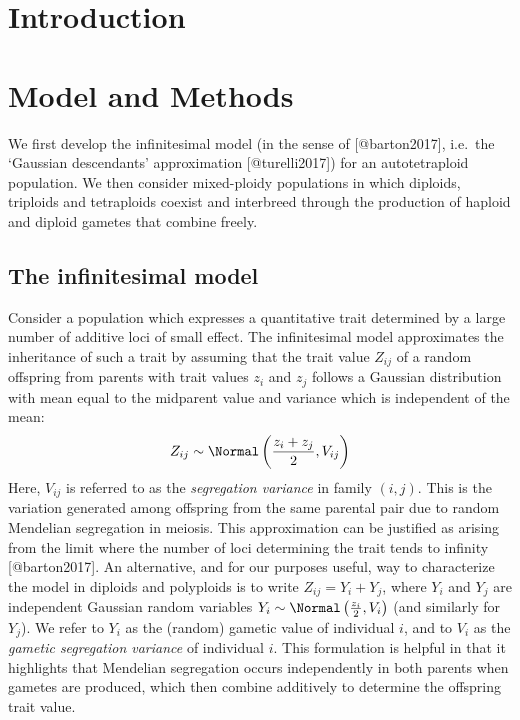 \hypertarget{introduction}{%
\section{Introduction}\label{introduction}}

\hypertarget{model-and-methods}{%
\section{Model and Methods}\label{model-and-methods}}

We first develop the infinitesimal model (in the sense of
{[}@barton2017{]}, i.e.~the `Gaussian descendants' approximation
{[}@turelli2017{]}) for an autotetraploid population. We then consider
mixed-ploidy populations in which diploids, triploids and tetraploids
coexist and interbreed through the production of haploid and diploid
gametes that combine freely.

\hypertarget{the-infinitesimal-model}{%
\subsection{The infinitesimal model}\label{the-infinitesimal-model}}

Consider a population which expresses a quantitative trait determined by
a large number of additive loci of small effect. The infinitesimal model
approximates the inheritance of such a trait by assuming that the trait
value \(Z_{ij}\) of a random offspring from parents with trait values
\(z_i\) and \(z_j\) follows a Gaussian distribution with mean equal to
the midparent value and variance which is independent of the mean:
\begin{align}
  Z_{ij} \sim \Normal\left(\frac{z_i + z_j}{2}, V_{ij}\right)
  \label{eq:inf}
  \end{align} Here, \(V_{ij}\) is referred to as the \emph{segregation
variance} in family \((i,j)\). This is the variation generated among
offspring from the same parental pair due to random Mendelian
segregation in meiosis. This approximation can be justified as arising
from the limit where the number of loci determining the trait tends to
infinity {[}@barton2017{]}. An alternative, and for our purposes useful,
way to characterize the model in diploids and polyploids is to write
\(Z_{ij} = Y_i + Y_j\), where \(Y_i\) and \(Y_j\) are independent
Gaussian random variables
\(Y_i \sim \Normal\left(\frac{z_i}{2}, V_i\right)\) (and similarly for
\(Y_j\)). We refer to \(Y_i\) as the (random) gametic value of
individual \(i\), and to \(V_i\) as the \emph{gametic segregation
variance} of individual \(i\). This formulation is helpful in that it
highlights that Mendelian segregation occurs independently in both
parents when gametes are produced, which then combine additively to
determine the offspring trait value.

